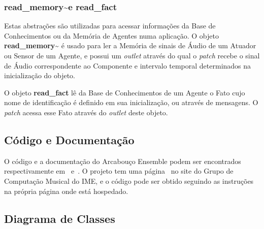 \documentclass[a4paper, 11pt, twoside]{article}
\begin{document}
\begin{multicols}{2}
\subsubsection{read\_memory\textasciitilde e read\_fact}

Estas abstrações são utilizadas para acessar informações da Base
de Conhecimentos ou da Memória de Agentes numa aplicação. O objeto
\textbf{read\_memory\textasciitilde} é usado para ler a Memória de
sinais de Áudio de um Atuador ou Sensor de um Agente, e possui
um \textit{outlet} através do qual o \textit{patch} recebe o sinal
de Áudio correspondente ao Componente e intervalo temporal determinados
na inicialização do objeto.

O objeto \textbf{read\_fact} lê da Base de Conhecimentos de um Agente
o Fato cujo nome de identificação é definido em sua inicialização, ou
através de mensagens. O \textit{patch} acessa esse Fato através do
\textit{outlet} deste objeto.

\subsection{Código e Documentação}

O código e a documentação do Arcabouço Ensemble podem ser encontrados
respectivamente em~\cite{ensemblecode} e~\cite{ensembledoc}.
O projeto tem uma página~\cite{ensemblegrouppage} no site do Grupo de Computação 
Musical do IME, e o código pode ser obtido seguindo as instruções na própria página
onde está hospedado.

\newpage
\subsection{Diagrama de Classes}\label{sec:diagrama}

\end{multicols}
\begin{figure}[H]
  \centering
  \label{fig2}
\end{figure}
\end{document}

